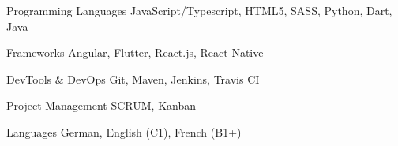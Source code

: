 

\begin{cvskills}

  \cvskill
    {Programming Languages} %
    {JavaScript/Typescript, HTML5, SASS, Python, Dart, Java} %

  \cvskill
    {Frameworks} %
    {Angular, Flutter, React.js, React Native} %
    
  \cvskill
    {DevTools \& DevOps} %
    {Git, Maven, Jenkins, Travis CI} %
    
  \cvskill
    {Project Management} %
    {SCRUM, Kanban} %

  \cvskill
    {Languages} %
    {German, English (C1), French (B1+)} %

\end{cvskills}

